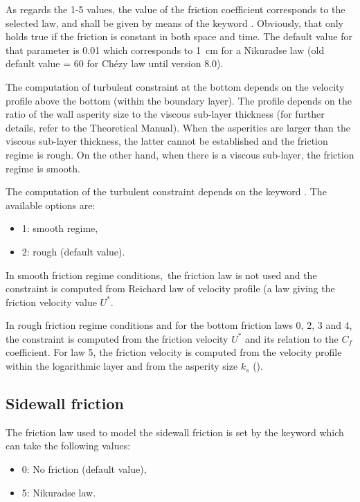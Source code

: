 As regards the 1-5 values, the value of the friction coefficient corresponds to
the selected law, and shall be given by means of the keyword . Obviously, that only holds true if the friction is
constant in both space and time. The default value for that parameter is 0.01
which corresponds to 1~cm for a Nikuradse law (old default value = 60 for Chézy
law until version 8.0).

The computation of turbulent constraint at the bottom depends on the velocity
profile above the bottom (within the boundary layer). The profile depends on
the ratio of the wall asperity size to the viscous sub-layer thickness (for
further details, refer to the Theoretical Manual). When the asperities are
larger than the viscous sub-layer thickness, the latter cannot be established
and the friction regime is rough. On the other hand, when there is a viscous
sub-layer, the friction regime is smooth.

The computation of the turbulent constraint depends on the keyword
. The available options are:

\begin{itemize}
\item  1: smooth regime,

\item  2: rough (default value).
\end{itemize}

In smooth friction regime conditions,~the friction law is not used and the
constraint is computed from Reichard law of velocity profile (a law giving the
friction velocity value $U^{*}$.

In rough friction regime conditions and for the bottom friction laws 0, 2, 3
and 4, the constraint is computed from the friction velocity $U^{*}$ and its
relation to the $C_{f}$ coefficient. For law 5, the friction velocity is
computed from the velocity profile within the logarithmic layer and from the
asperity size $k_{s}$ ().


\subsection{Sidewall friction}

The friction law used to model the sidewall friction is set by the keyword
 which can take the following
values:

\begin{itemize}
\item  0: No friction (default value),

\item  5: Nikuradse law.
\end{itemize}

